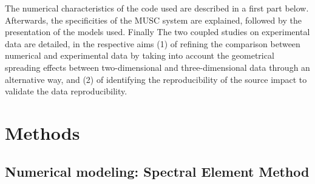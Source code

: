 \documentclass[manuscript,revised]{geophysics}
\newcommand{\twod}{two-dimensional }
\newcommand{\thrd}{three-dimensional }
\begin{document}

\noindent The numerical characteristics of the code used are described in a first part below. Afterwards, the specificities of the MUSC system are explained, followed by the presentation of the models used. Finally The two coupled studies on experimental data are detailed, in the respective aims (1) of refining the comparison between numerical and experimental data by taking into account the geometrical spreading effects between \twod and \thrd data through an alternative way, and (2) of identifying the reproducibility of the source impact to validate the data reproducibility.


\section{Methods}

\subsection{Numerical modeling: Spectral Element Method}

\end{document}
